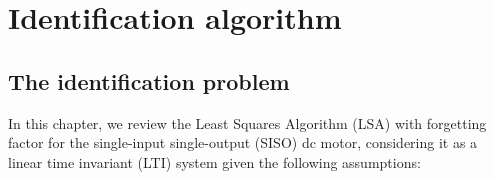 \chapter{Identification algorithm}
\section{The identification problem}

In this chapter, we review the Least Squares Algorithm (LSA) with forgetting factor for the single-input single-output (SISO) dc motor, considering it as a linear time invariant (LTI) system given the following assumptions:
%
%	
%
